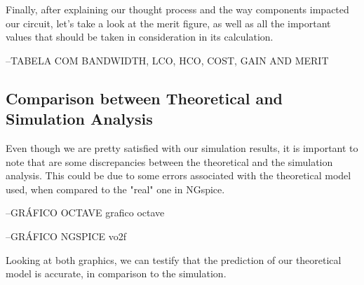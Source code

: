 Finally, after explaining our thought process and the way components impacted our circuit, let's take a look at the merit figure, as well as all the important values that should be taken in consideration in its calculation.

--TABELA COM BANDWIDTH, LCO, HCO, COST, GAIN AND MERIT

\subsection{Comparison between Theoretical and Simulation Analysis}

Even though we are pretty satisfied with our simulation results, it is important to note that are some discrepancies between the theoretical and the simulation analysis. This could be due to some errors associated with the theoretical model used, when compared to the "real" one in NGspice.




--GRÁFICO OCTAVE grafico octave

--GRÁFICO NGSPICE vo2f

Looking at both graphics, we can testify that the prediction of our theoretical model is accurate, in comparison to the simulation.
